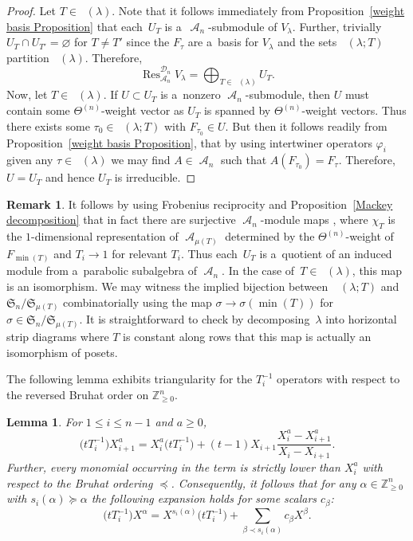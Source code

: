 \documentclass[10pt,a4paper]{amsart}
\numberwithin{equation}{section}
\newtheorem{Lemma}[Theorem]{Lemma}
\theoremstyle{definition}
\newtheorem{Remark}[Theorem]{Remark}
\DeclareMathOperator{\RYT}{\mathrm{RYT}_{\geq 0}}
\DeclareMathOperator{\PSYT}{\mathrm{PSYT}_{\geq 0}}
\DeclareMathOperator{\RSSYT}{\mathrm{RSSYT}_{\geq 0}}
\DeclareMathOperator{\sA}{\mathscr{A}}
\DeclareMathOperator{\sD}{\mathscr{D}}
\DeclareMathOperator{\Ind}{Ind}
\DeclareMathOperator{\Res}{Res}
\DeclareMathOperator{\Min}{\mathrm{min}}
\begin{document}
\begin{proof}
 Let $T \in \RYT(\lambda)$. Note that it follows immediately from Proposition~\ref{weight basis Proposition} that each~$U_T$ is a~$\sA_n$-submodule of $V_{\lambda}$. Further, trivially $U_T \cap U_{T'} = \varnothing$ for $T \neq T'$ since the $F_{\tau}$ are a~basis for $V_{\lambda}$ and the sets $\PSYT(\lambda;T)$ partition $\PSYT(\lambda)$. Therefore,
 \[
 \Res^{\sD_n}_{\sA_n} V_{\lambda} = \bigoplus_{T \in \RYT(\lambda)} U_T.
 \]
 Now, let $T \in \RYT(\lambda)$. If $U \subset U_{T}$ is a~nonzero $\sA_n$-submodule, then $U$ must contain some $\Theta^{(n)}$-weight vector as $U_T$ is spanned by $\Theta^{(n)}$-weight vectors. Thus there exists some ${\tau_0 \!\in\! \PSYT(\lambda;T)}$ with $F_{\tau_0} \in U$. But then it follows readily from Proposition~\ref{weight basis Proposition}, that by using intertwiner operators $\varphi_i$ given any $\tau \in \PSYT(\lambda)$ we may find $A \in \sA_n$ such that $A(F_{\tau_0}) = F_{\tau}$. Therefore, $U = U_T$ and hence $U_T$ is irreducible.
\end{proof}

\begin{Remark}\label{PSYT orbits using Bruhat}
 It follows by using Frobenius reciprocity and Proposition~\ref{Mackey decomposition} that in fact there are surjective $\sA_n$-module maps
\smash{$ \Ind_{\sA_{\mu(T)}}^{\sA_n} \chi_T \rightarrow U_T$},
 where $\chi_T$ is the $1$-dimensional representation of $\sA_{\mu(T)}$ determined by the $\Theta^{(n)}$-weight of $F_{\Min(T)}$ and $T_i \rightarrow 1$ for relevant $T_i$. Thus each~$U_T$ is a~quotient of an induced module from a~parabolic subalgebra of $\sA_n$. In the case of~${T \in \RSSYT(\lambda)}$, this map is an isomorphism. We may witness the implied bijection between~${\PSYT(\lambda;T)}$ and $\mathfrak{S}_n/\mathfrak{S}_{\mu(T)}$ combinatorially using the map $\sigma \rightarrow \sigma(\Min(T))$
 for~${\sigma \in \mathfrak{S}_n/\mathfrak{S}_{\mu(T)}}$. It is straightforward to check by decomposing~$\lambda$ into horizontal strip diagrams where $T$ is constant along rows that this map is actually an isomorphism of posets.
\end{Remark}

The following lemma exhibits triangularity for the $T_i^{-1}$ operators with respect to the reversed Bruhat order on $\mathbb{Z}_{\geq 0}^{n}$.

\begin{Lemma}\label{action of T inverse}
 For $1\leq i \leq n-1$ and $a \geq 0$,
 \[
 \bigl(tT_i^{-1}\bigr)X_{i+1}^{a} = X_i^{a}\bigl(tT_i^{-1}\bigr) + (t-1)X_{i+1}\frac{X_i^{a}-X_{i+1}^{a}}{X_i-X_{i+1}}.
 \]
 Further, every monomial occurring in the term  is strictly lower than $X_i^{a}$ with respect to the Bruhat ordering $\preceq$. Consequently, it follows that for any $\alpha \in \mathbb{Z}^n_{\geq 0}$ with $s_i(\alpha) \succeq \alpha$ the following expansion holds for some scalars $c_{\beta}$:
 \[
 \bigl(tT_i^{-1}\bigr)X^{\alpha} = X^{s_i(\alpha)}\bigl(tT_i^{-1}\bigr) + \sum_{\beta \prec s_i(\alpha)} c_{\beta}X^{\beta}.
 \]
\end{Lemma}
\end{document}
